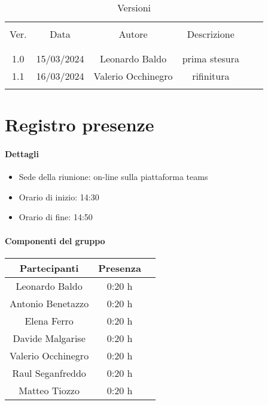 \documentclass[italian,12pt]{article} %
\begin{document}


\newpage





\begin{table}[!h]
	\caption{Versioni}
	\begin{center}
		\begin{tabular}{ c c c c c c }
			\hline \\[-2ex]
			Ver. & Data & Autore & Descrizione \\
			\\[-2ex] \hline \\[-1.5ex]
			1.0 & 15/03/2024 & Leonardo Baldo& prima stesura \\
			1.1 & 16/03/2024 & Valerio Occhinegro& rifinitura  \\
			\\[-1.5ex] \hline
		\end{tabular}
	\end{center}
\end{table}
\newpage

\tableofcontents

\newpage

\section{Registro presenze}

\paragraph{Dettagli}

\begin{itemize}
	\item Sede della riunione: on-line sulla piattaforma teams
	\item Orario di inizio: 14:30
	\item Orario di fine: 14:50
\end{itemize}

\paragraph{Componenti del gruppo}

\begin{flushleft}
\begin{table}[!h]
\begin{tabular}{ |c|c|c| } 
	\hline
	Partecipanti & Presenza \\
	\hline 
	Leonardo Baldo 		 & 0:20 h \\ 
	Antonio Benetazzo 	 & 0:20 h \\
	Elena Ferro 		 & 0:20 h \\
	Davide Malgarise 	 & 0:20 h \\
	Valerio Occhinegro 	 & 0:20 h \\
	Raul Seganfreddo 	 & 0:20 h \\
	Matteo Tiozzo 		 & 0:20 h \\ 
	\hline
\end{tabular}
\end{table}
\end{flushleft}
\end{document}
